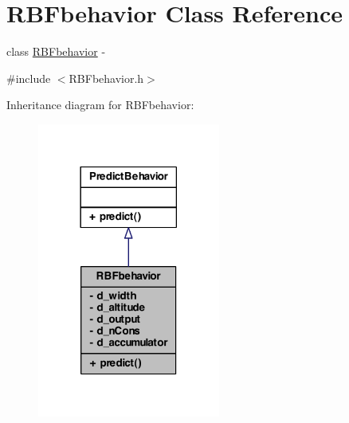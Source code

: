 \hypertarget{class_r_b_fbehavior}{
\section{RBFbehavior Class Reference}
\label{class_r_b_fbehavior}
}


class \hyperlink{class_r_b_fbehavior}{RBFbehavior} -\/  




{\ttfamily \#include $<$RBFbehavior.h$>$}



Inheritance diagram for RBFbehavior:\nopagebreak
\begin{figure}[H]
\begin{center}
\leavevmode
\includegraphics[width=170pt]{class_r_b_fbehavior__inherit__graph}
\end{center}
\end{figure}


